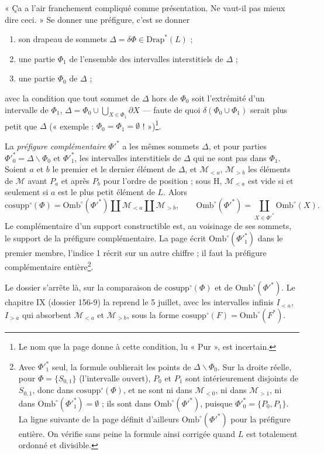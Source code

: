 \documentclass[11pt,a4paper]{article}
\begin{document}
« Ça a l'air franchement compliqué comme présentation. Ne vaut-il pas mieux
dire ceci. » Se donner une préfigure, c'est se donner
\begin{enumerate}
\item[1°)] son drapeau de sommets $\Delta = \delta\Phi \in
\mathrm{Drap}^{*}(L)$ ;
\item[2°)] une partie $\Phi_{1}$ de l'ensemble des intervalles interstitiels de
$\Delta$ ;
\item[3°)] une partie $\Phi_{0}$ de $\Delta$ ;
\end{enumerate}
avec la condition que tout sommet de $\Delta$ hors de $\Phi_{0}$ soit
l'extrémité d'un intervalle de $\Phi_{1}$, $\Delta = \Phi_{0} \cup
\bigcup_{X \in \Phi_{1}} \partial X$ --- faute de quoi $\delta(\Phi_{0} \cup
\Phi_{1})$ serait plus petit que $\Delta$ (« exemple : $\Phi_{0} = \Phi_{1} =
\emptyset$ ! »)\footnote{Le nom que la page donne à cette condition, lu
« Pur », est incertain.}.

La \emph{préfigure complémentaire} $\Phi'^{*}$ a les mêmes sommets $\Delta$, et
pour parties $\Phi'^{*}_{0} = \Delta \smallsetminus \Phi_{0}$ et
$\Phi'^{*}_{1}$, les intervalles interstitiels de $\Delta$ qui ne sont pas dans
$\Phi_{1}$. Soient $a$ et $b$ le premier et le dernier élément de $\Delta$, et
$\mathcal{M}_{<a}$, $\mathcal{M}_{>b}$ les éléments de $\mathcal{M}$ avant
$P_{a}$ et après $P_{b}$ pour l'ordre de position ; sous H, $\mathcal{M}_{<a}$
est vide si et seulement si $a$ est le plus petit élément de $L$. Alors
\[
\mathrm{cosupp}^{\circ}(\Phi) = \mathrm{Omb}^{\circ}(\Phi'^{*}) \amalg
\mathcal{M}_{<a} \amalg \mathcal{M}_{>b}, \qquad
\mathrm{Omb}^{\circ}(\Phi'^{*}) = \coprod_{X \in \Phi'^{*}}
\mathrm{Omb}^{\circ}(X) .
\]
Le complémentaire d'un support constructible est, au voisinage de ses sommets,
le support de la préfigure complémentaire. La page écrit
$\mathrm{Omb}^{\circ}(\Phi'^{*}_{1})$ dans le premier membre, l'indice 1
récrit sur un autre chiffre ; il faut la préfigure complémentaire
entière\footnote{Avec $\Phi'^{*}_{1}$ seul, la formule oublierait les points de
$\Delta \smallsetminus \Phi_{0}$. Sur la droite réelle, pour $\Phi =
\{S_{0,1}\}$ (l'intervalle ouvert), $P_{0}$ et $P_{1}$ sont intérieurement
disjoints de $S_{0,1}$, donc dans $\mathrm{cosupp}^{\circ}(\Phi)$, et ne sont
ni dans $\mathcal{M}_{<0}$, ni dans $\mathcal{M}_{>1}$, ni dans
$\mathrm{Omb}^{\circ}(\Phi'^{*}_{1}) = \emptyset$ ; ils sont dans
$\mathrm{Omb}^{\circ}(\Phi'^{*})$, puisque $\Phi'^{*}_{0} = \{P_{0}, P_{1}\}$.
La ligne suivante de la page définit d'ailleurs
$\mathrm{Omb}^{\circ}(\Phi'^{*})$ pour la préfigure entière. On vérifie sans
peine la formule ainsi corrigée quand $L$ est totalement ordonné et
divisible.}.

Le dossier s'arrête là, sur la comparaison de $\mathrm{cosupp}^{\circ}(\Phi)$
et de $\mathrm{Omb}^{\circ}(\Phi'^{*})$. Le chapitre IX (dossier 156-9) la
reprend le 5 juillet, avec les intervalles infinis $I_{<a}$, $I_{>a}$ qui
absorbent $\mathcal{M}_{<a}$ et $\mathcal{M}_{>b}$, sous la forme
$\mathrm{cosupp}^{\circ}(F) = \mathrm{Omb}^{\circ}(F^{*})$.
\end{document}
